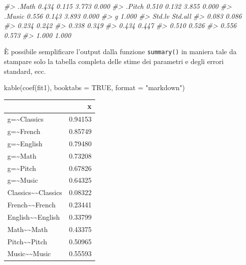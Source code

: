 \documentclass[
  11pt,
]{krantz}
\makeatletter
\newenvironment{Shaded}{\begin{snugshade}}{\end{snugshade}}
\newcommand{\AttributeTok}[1]{\textcolor[rgb]{0.61,0.61,0.61}{#1}}
\newcommand{\CommentTok}[1]{\textcolor[rgb]{0.37,0.37,0.37}{\textit{#1}}}
\newcommand{\ConstantTok}[1]{\textcolor[rgb]{0,0,0}{#1}}
\newcommand{\FunctionTok}[1]{\textcolor[rgb]{0,0,0}{#1}}
\newcommand{\NormalTok}[1]{#1}
\newcommand{\StringTok}[1]{\textcolor[rgb]{0.5,0.5,0.5}{#1}}
\newenvironment{kframe}{%
\medskip{}
\setlength{\fboxsep}{.8em}
 \def\at@end@of@kframe{}%
 \ifinner\ifhmode%
  \def\at@end@of@kframe{\end{minipage}}%
  \begin{minipage}{\columnwidth}%
 \fi\fi%
 \def\FrameCommand##1{\hskip\@totalleftmargin \hskip-\fboxsep
 \colorbox{shadecolor}{##1}\hskip-\fboxsep
     \hskip-\linewidth \hskip-\@totalleftmargin \hskip\columnwidth}%
 \MakeFramed {\advance\hsize-\width
   \@totalleftmargin\z@ \linewidth\hsize
   \@setminipage}}%
 {\par\unskip\endMakeFramed%
 \at@end@of@kframe}
\renewenvironment{Shaded}{\begin{kframe}}{\end{kframe}}
\theoremstyle{definition}
\theoremstyle{definition}
\theoremstyle{definition}
\theoremstyle{definition}
\theoremstyle{remark}
\makeatother
\begin{document}
\begin{Shaded}
\begin{Highlighting}[]
\CommentTok{\#\textgreater{}    .Math              0.434    0.115    3.773    0.000}
\CommentTok{\#\textgreater{}    .Pitch             0.510    0.132    3.855    0.000}
\CommentTok{\#\textgreater{}    .Music             0.556    0.143    3.893    0.000}
\CommentTok{\#\textgreater{}     g                 1.000                           }
\CommentTok{\#\textgreater{}    Std.lv  Std.all}
\CommentTok{\#\textgreater{}     0.083    0.086}
\CommentTok{\#\textgreater{}     0.234    0.242}
\CommentTok{\#\textgreater{}     0.338    0.349}
\CommentTok{\#\textgreater{}     0.434    0.447}
\CommentTok{\#\textgreater{}     0.510    0.526}
\CommentTok{\#\textgreater{}     0.556    0.573}
\CommentTok{\#\textgreater{}     1.000    1.000}
\end{Highlighting}
\end{Shaded}

È possibile semplificare l'output dalla funzione \texttt{summary()} in maniera tale da stampare solo la tabella completa delle stime dei parametri e degli errori standard, ecc.

\begin{Shaded}
\begin{Highlighting}[]
\FunctionTok{kable}\NormalTok{(}\FunctionTok{coef}\NormalTok{(fit1), }\AttributeTok{booktabs =} \ConstantTok{TRUE}\NormalTok{, }\AttributeTok{format =} \StringTok{"markdown"}\NormalTok{)}
\end{Highlighting}
\end{Shaded}

\begin{longtable}[]{@{}lr@{}}
\toprule
& x \\
\midrule
\endhead
g=\textasciitilde Classics & 0.94153 \\
g=\textasciitilde French & 0.85749 \\
g=\textasciitilde English & 0.79480 \\
g=\textasciitilde Math & 0.73208 \\
g=\textasciitilde Pitch & 0.67826 \\
g=\textasciitilde Music & 0.64325 \\
Classics\textasciitilde\textasciitilde Classics & 0.08322 \\
French\textasciitilde\textasciitilde French & 0.23441 \\
English\textasciitilde\textasciitilde English & 0.33799 \\
Math\textasciitilde\textasciitilde Math & 0.43375 \\
Pitch\textasciitilde\textasciitilde Pitch & 0.50965 \\
Music\textasciitilde\textasciitilde Music & 0.55593 \\
\bottomrule
\end{longtable}
\end{document}
